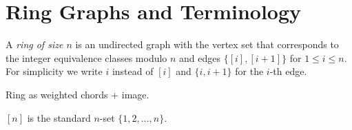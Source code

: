 \section{Ring Graphs and Terminology}

A \emph{ring of size $n$} is an undirected graph with the vertex set that corresponds to the integer equivalence classes modulo $n$ and edges $\{[i], [i+1]\}$ for $1 \leq i \leq n$.
For simplicity we write $i$ instead of $[i]$ and $\{i, i+1\}$ for the $i$-th edge. 

Ring as weighted chords + image.

$[n]$ is the standard $n$-set $\{1, 2, \ldots, n\}$.

